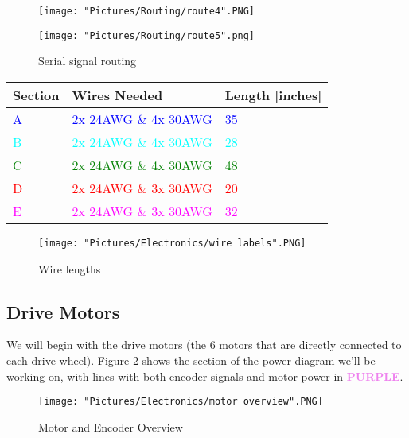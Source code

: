 \documentclass[12pt]{article}
\begin{document}
\begin{figure}[H]
 	\centering
  	\begin{minipage}[b]{0.48\textwidth}
		\texttt{[image: "Pictures/Routing/route4".PNG]}
  	\end{minipage}
  	\hfill
  	\begin{minipage}[b]{0.42\textwidth}
    		\texttt{[image: "Pictures/Routing/route5".png]}
  	\end{minipage}
	\caption{Serial signal routing}
\end{figure}




\begin{tabular}[3] {| p{2cm} | p{7cm} | p{4cm} |}
	\hline
	\textbf{Section} & \textbf{Wires Needed} & \textbf{Length [inches]}  \\ \hline
	\textcolor{blue}{A} & \textcolor{blue}{2x 24AWG \& 4x 30AWG} & \textcolor{blue}{35} \\ \hline
	\textcolor{cyan}{B} & \textcolor{cyan}{2x 24AWG \& 4x 30AWG} & \textcolor{cyan}{28} \\ \hline
	\textcolor{green}{C} & \textcolor{green}{2x 24AWG \& 4x 30AWG} & \textcolor{green}{48} \\ \hline
	\textcolor{red}{D} & \textcolor{red}{2x 24AWG \& 3x 30AWG} & \textcolor{red}{20} \\ \hline
	\textcolor{magenta}{E} & \textcolor{magenta}{2x 24AWG \& 3x 30AWG} & \textcolor{magenta}{32} \\ \hline
\end{tabular}

\begin{figure}[H]
 	\centering
	\texttt{[image: "Pictures/Electronics/wire labels".PNG]}
 	\caption{Wire lengths}
	\label{wire lengths}
\end{figure}

\subsection{Drive Motors}
We will begin with the drive motors (the 6 motors that are directly connected to each drive wheel). Figure \ref{motors over} shows the section of the power diagram we'll be working on, with lines with both encoder signals and motor power in \textcolor{violet}{\textbf{PURPLE}}.

\begin{figure}[H]
  	\centering
    	\texttt{[image: "Pictures/Electronics/motor overview".PNG]}
 	\caption{Motor and Encoder Overview}
	\label{motors over}
\end{figure}
\end{document}
